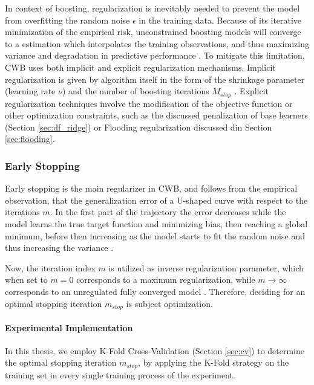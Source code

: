 \documentclass[fontsize=12 pt]{scrartcl}
\begin{document}
In context of boosting, regularization is inevitably needed to prevent the model from overfitting the random noise $\epsilon$ in the training data. Because of its iterative minimization of the empirical risk, unconstrained boosting models will converge to a estimation which interpolates the training observations, and thus maximizing variance and degradation in predictive performance  \citep{buhlmann2007boosting}. To mitigate this limitation, CWB uses both implicit and explicit regularization mechanisms. Implicit regularization is given by algorithm itself in the form of the shrinkage parameter (learning rate $\nu$) and the number of boosting iterations $M_{stop}$ \citep{friedman2001greedy}. Explicit regularization techniques involve the modification of the objective function or other optimization constraints, such as the discussed penalization of base learners (Section \ref{sec:df_ridge}) or Flooding regularization discussed din Section \ref{sec:flooding}. 

\subsubsection{Early Stopping}

Early stopping is the main regularizer in CWB, and follows from the empirical observation, that the generalization error of a U-shaped curve with respect to the iterations $m$. In the first part of the trajectory the error decreases while the model learns the true target function and minimizing bias, then reaching a global minimum, before then increasing as the model starts to fit the random noise and thus increasing the variance \citep{zhang2005boosting}.

Now, the iteration index $m$ is utilized as inverse regularization parameter, which when set to $m=0$ corresponds to a maximum regularization, while $m \to \infty$ corresponds to an unregulated fully converged model \citet{buhlmann2003boosting}. Therefore, deciding for an optimal stopping iteration $m_{stop}$ is subject optimization.

\paragraph{Experimental Implementation}

In this thesis, we employ K-Fold Cross-Validation (Section \ref{sec:cv}) to determine the optimal stopping iteration $m_{stop}$, by applying the K-Fold strategy on the training set in every single training process of the experiment.
\end{document}
